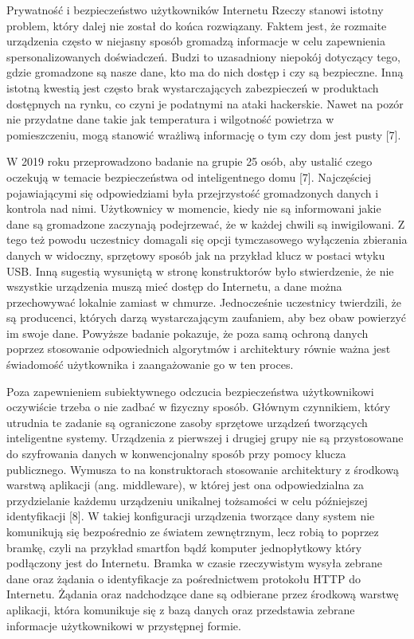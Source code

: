 \documentclass[12pt, twoside, openany]{mwrep}
\begin{document}
Prywatność i bezpieczeństwo użytkowników Internetu Rzeczy stanowi istotny problem, który dalej nie został do końca rozwiązany. Faktem jest, że rozmaite urządzenia często w niejasny sposób gromadzą informacje w celu zapewnienia spersonalizowanych doświadczeń. Budzi to uzasadniony niepokój dotyczący tego, gdzie gromadzone są nasze dane, kto ma do nich dostęp i czy są bezpieczne. Inną istotną kwestią jest często brak wystarczających zabezpieczeń w produktach dostępnych na rynku, co czyni je podatnymi na ataki hackerskie. Nawet na pozór nie przydatne dane takie jak temperatura i wilgotność powietrza w pomieszczeniu, mogą stanowić wrażliwą informację o tym czy dom jest pusty [7].
\par
W 2019 roku przeprowadzono badanie na grupie 25 osób, aby ustalić czego oczekują w temacie bezpieczeństwa od inteligentnego domu [7]. Najczęściej pojawiającymi się odpowiedziami była przejrzystość gromadzonych danych i kontrola nad nimi. Użytkownicy w momencie, kiedy nie są informowani jakie dane są gromadzone zaczynają podejrzewać, że w każdej chwili są inwigilowani. Z tego też powodu uczestnicy domagali się opcji tymczasowego wyłączenia zbierania danych w widoczny, sprzętowy sposób jak na przykład klucz w postaci wtyku USB. Inną sugestią wysuniętą w stronę konstruktorów było stwierdzenie, że nie wszystkie urządzenia muszą mieć dostęp do Internetu, a dane można przechowywać lokalnie zamiast w chmurze. Jednocześnie uczestnicy twierdzili, że są producenci, których darzą wystarczającym zaufaniem, aby bez obaw powierzyć im swoje dane. Powyższe badanie pokazuje, że poza samą ochroną danych poprzez stosowanie odpowiednich algorytmów i architektury równie ważna jest świadomość użytkownika i zaangażowanie go w ten proces.
\par
Poza zapewnieniem subiektywnego odczucia bezpieczeństwa użytkownikowi oczywiście trzeba o nie zadbać w fizyczny sposób. Głównym czynnikiem, który utrudnia te zadanie są ograniczone zasoby sprzętowe urządzeń tworzących inteligentne systemy. Urządzenia z pierwszej i drugiej grupy nie są przystosowane do szyfrowania danych w konwencjonalny sposób przy pomocy klucza publicznego. Wymusza to na konstruktorach stosowanie architektury z środkową warstwą aplikacji (ang. middleware), w której jest ona odpowiedzialna za przydzielanie każdemu urządzeniu unikalnej tożsamości w celu późniejszej identyfikacji [8]. W takiej konfiguracji urządzenia tworzące dany system nie komunikują się bezpośrednio ze światem zewnętrznym, lecz robią to poprzez bramkę, czyli na przykład smartfon bądź komputer jednopłytkowy który podłączony jest do Internetu. Bramka w czasie rzeczywistym wysyła zebrane dane oraz żądania o identyfikacje za pośrednictwem protokołu HTTP do Internetu. Żądania oraz nadchodzące dane są odbierane przez środkową warstwę aplikacji, która komunikuje się z bazą danych oraz przedstawia zebrane informacje użytkownikowi w przystępnej formie. 
\end{document}
